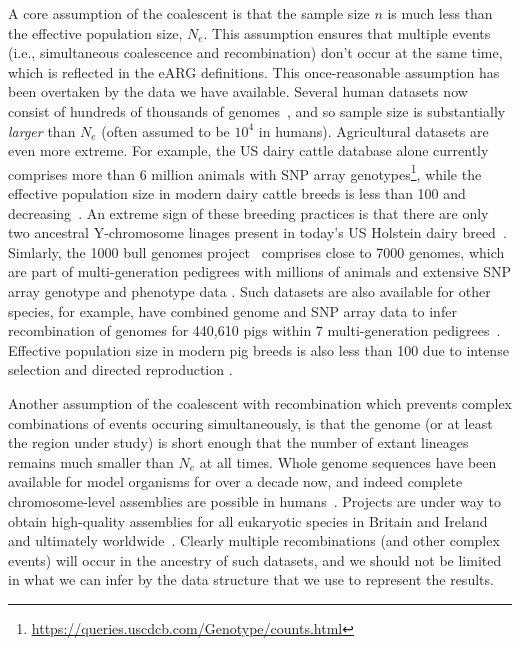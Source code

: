 \documentclass{article}
\begin{document}
A core assumption of the coalescent is that the sample size $n$
is much less than the effective population size, $N_e$. This
assumption ensures that multiple events (i.e., simultaneous
coalescence and recombination) don't occur at the same
time, which is reflected in the eARG definitions.
This once-reasonable assumption has been overtaken by
the data we have available.
Several human datasets now consist of hundreds of thousands of
genomes~\citep{bycroft2018genome,karczewski2020mutational,tanjo2021practical},
and so sample size is substantially \emph{larger} than $N_e$
(often assumed to be $10^4$ in humans).
Agricultural datasets are even more extreme.
For example,
the US dairy cattle database alone currently comprises more than 6 million
animals with SNP array
genotypes\footnote{\url{https://queries.uscdcb.com/Genotype/counts.html}},
while the effective population size in modern dairy cattle breeds is
less than 100 and decreasing~\citep{MacLeod2013,Makanjuola2020}.
An extreme sign of these breeding practices is that there are only two ancestral
Y-chromosome linages present in today's US Holstein dairy breed~\citep{Yue2015}.
Simlarly, the 1000 bull genomes project~\citep{hayes20191000}
comprises close to 7000 genomes, which are part of multi-generation pedigrees
with millions of animals and extensive SNP array genotype and phenotype
data \citep[e.g.][]{Cesarani2022}.
Such datasets are also available for other species,
for example, \citet{RosFreixedes2022} have combined genome
and SNP array data to infer recombination of genomes for 440,610 pigs within
7 multi-generation pedigrees~\citep{whalen2018,Johnsson2021,Ros-Freixedes2020}.
Effective population size in modern pig breeds is also less than 100 due to
intense selection and directed reproduction \citep{Hall2016,Porcnic2016}.

Another assumption of the coalescent with recombination which prevents complex
combinations of events occuring simultaneously, is that the genome (or
at least the region under study) is short enough that the number of extant
lineages remains much smaller than $N_e$ at all times. Whole
genome sequences have been available for model organisms
for over a decade now, %
and indeed complete chromosome-level assemblies are possible
in humans~\citep{miga2020telomere}.
Projects are under way to obtain high-quality assemblies
for all eukaryotic species in Britain and Ireland~\citep{darwin2022sequence}
and ultimately worldwide~\citep{lewin2022earth}.
Clearly multiple recombinations (and other complex events) will
occur in the ancestry of such datasets, and we should not be
limited in what we can infer by the data structure that we
use to represent the results.
\end{document}
